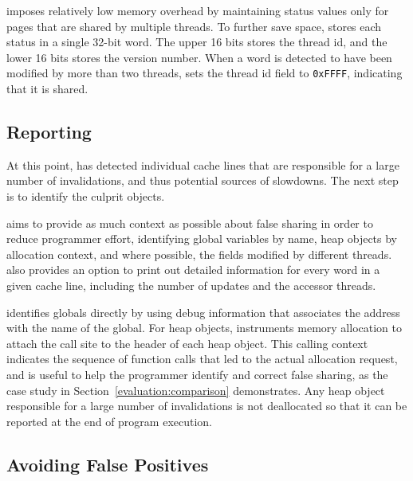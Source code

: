 \sheriffdetect{} imposes relatively low memory overhead by maintaining
status values only for pages that are shared by multiple threads. To
further save space, \sheriffdetect{} stores each status in a single
32-bit word. The upper 16 bits stores the thread id, and the lower 16
bits stores the version number. When a word is detected to have been
modified by more than two threads, \sheriffdetect{} sets the thread id
field to \texttt{0xFFFF}, indicating that it is shared.



\subsection{Reporting}

\label{detection:object}

At this point, \sheriffdetect{} has detected individual cache lines that
are responsible for a large number of invalidations, and thus potential
sources of slowdowns. The next step is to identify the culprit objects.

\sheriffdetect{} aims to provide as much
context as possible about false sharing in order to reduce programmer
effort, identifying global variables by name, heap objects by
allocation context, and where possible, the fields modified by
different threads.
\sheriffdetect{} also provides an option to print out detailed information for every word in a
given cache line, including the number of updates and the accessor threads.

\sheriffdetect{} identifies globals directly by using debug
information that associates the address with the name of the
global. For heap objects, \sheriffdetect{} instruments memory
allocation to attach the call site to the header of each heap
object. This calling context indicates the sequence of function calls
that led to the actual allocation request, and is useful to help the
programmer identify and correct false sharing, as the case
study in Section~\ref{evaluation:comparison} demonstrates. Any heap
object responsible for a large number of invalidations is not
deallocated so that it can be reported at the end of program
execution.

\subsection{Avoiding False Positives}
\label{detection:avoidfalsepositive}

